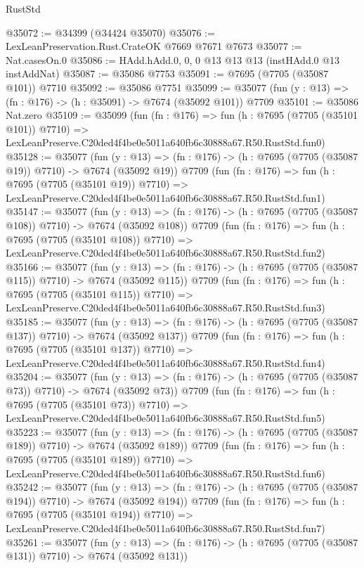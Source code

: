 \begin{lexlean}{RustStd}
\begin{coremodule}
@35072 := @34399 (@34424 @35070)
@35076 := LexLeanPreservation.Rust.CrateOK @7669 @7671 @7673
@35077 := Nat.casesOn.{0}
@35086 := HAdd.hAdd.{0, 0, 0} @13 @13 @13 (instHAdd.{0} @13 instAddNat)
@35087 := @35086 @7753
@35091 := @7695 (@7705 (@35087 @101)) @7710
@35092 := @35086 @7751
@35099 := @35077 (fun (y : @13) => (fn : @176) -> (h : @35091) -> @7674 (@35092 @101)) @7709
@35101 := @35086 Nat.zero
@35109 := @35099
    (fun (fn : @176) =>
    fun (h : @7695 (@7705 (@35101 @101)) @7710) =>
    LexLeanPreserve.C20ded4f4be0e5011a640fb6c30888a67.R50.RustStd.fun0)
@35128 := @35077
    (fun (y : @13) => (fn : @176) -> (h : @7695 (@7705 (@35087 @19)) @7710) -> @7674 (@35092 @19))
    @7709
    (fun (fn : @176) =>
    fun (h : @7695 (@7705 (@35101 @19)) @7710) =>
    LexLeanPreserve.C20ded4f4be0e5011a640fb6c30888a67.R50.RustStd.fun1)
@35147 := @35077
    (fun (y : @13) => (fn : @176) -> (h : @7695 (@7705 (@35087 @108)) @7710) -> @7674 (@35092 @108))
    @7709
    (fun (fn : @176) =>
    fun (h : @7695 (@7705 (@35101 @108)) @7710) =>
    LexLeanPreserve.C20ded4f4be0e5011a640fb6c30888a67.R50.RustStd.fun2)
@35166 := @35077
    (fun (y : @13) => (fn : @176) -> (h : @7695 (@7705 (@35087 @115)) @7710) -> @7674 (@35092 @115))
    @7709
    (fun (fn : @176) =>
    fun (h : @7695 (@7705 (@35101 @115)) @7710) =>
    LexLeanPreserve.C20ded4f4be0e5011a640fb6c30888a67.R50.RustStd.fun3)
@35185 := @35077
    (fun (y : @13) => (fn : @176) -> (h : @7695 (@7705 (@35087 @137)) @7710) -> @7674 (@35092 @137))
    @7709
    (fun (fn : @176) =>
    fun (h : @7695 (@7705 (@35101 @137)) @7710) =>
    LexLeanPreserve.C20ded4f4be0e5011a640fb6c30888a67.R50.RustStd.fun4)
@35204 := @35077
    (fun (y : @13) => (fn : @176) -> (h : @7695 (@7705 (@35087 @73)) @7710) -> @7674 (@35092 @73))
    @7709
    (fun (fn : @176) =>
    fun (h : @7695 (@7705 (@35101 @73)) @7710) =>
    LexLeanPreserve.C20ded4f4be0e5011a640fb6c30888a67.R50.RustStd.fun5)
@35223 := @35077
    (fun (y : @13) => (fn : @176) -> (h : @7695 (@7705 (@35087 @189)) @7710) -> @7674 (@35092 @189))
    @7709
    (fun (fn : @176) =>
    fun (h : @7695 (@7705 (@35101 @189)) @7710) =>
    LexLeanPreserve.C20ded4f4be0e5011a640fb6c30888a67.R50.RustStd.fun6)
@35242 := @35077
    (fun (y : @13) => (fn : @176) -> (h : @7695 (@7705 (@35087 @194)) @7710) -> @7674 (@35092 @194))
    @7709
    (fun (fn : @176) =>
    fun (h : @7695 (@7705 (@35101 @194)) @7710) =>
    LexLeanPreserve.C20ded4f4be0e5011a640fb6c30888a67.R50.RustStd.fun7)
@35261 := @35077
    (fun (y : @13) => (fn : @176) -> (h : @7695 (@7705 (@35087 @131)) @7710) -> @7674 (@35092 @131))

\end{coremodule}
\end{lexlean}
